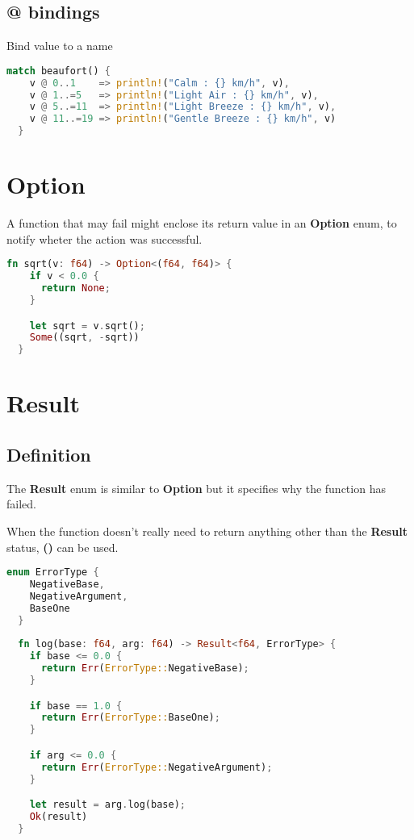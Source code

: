 \documentclass{article}
\begin{document}
\subsection{@ bindings}

Bind value to a name

\begin{lstlisting}[language=Rust, style=boxed, numbers=none]
  match beaufort() {
    v @ 0..1    => println!("Calm : {} km/h", v),
    v @ 1..=5   => println!("Light Air : {} km/h", v),
    v @ 5..=11  => println!("Light Breeze : {} km/h", v),
    v @ 11..=19 => println!("Gentle Breeze : {} km/h", v)
  }
\end{lstlisting}

\pagebreak

\section{Option}

A function that may fail might enclose its return value in an
\textbf{Option} enum, to notify wheter the action was successful.

\begin{lstlisting}[language=Rust, style=boxed, numbers=none]
  fn sqrt(v: f64) -> Option<(f64, f64)> {
    if v < 0.0 {
      return None;
    }

    let sqrt = v.sqrt();
    Some((sqrt, -sqrt))
  }
\end{lstlisting}

\section{Result}

\subsection{Definition}

The \textbf{Result} enum is similar to \textbf{Option} but it
specifies why the function has failed.

When the function doesn't really need to return anything other than the
\textbf{Result} status, \textbf{()} can be used.

\begin{lstlisting}[language=Rust, style=boxed, numbers=none]
  enum ErrorType {
    NegativeBase,
    NegativeArgument,
    BaseOne
  }
  
  fn log(base: f64, arg: f64) -> Result<f64, ErrorType> {
    if base <= 0.0 {
      return Err(ErrorType::NegativeBase);
    }

    if base == 1.0 {
      return Err(ErrorType::BaseOne);
    }

    if arg <= 0.0 {
      return Err(ErrorType::NegativeArgument);
    }

    let result = arg.log(base);
    Ok(result)
  }
\end{lstlisting}
\end{document}
